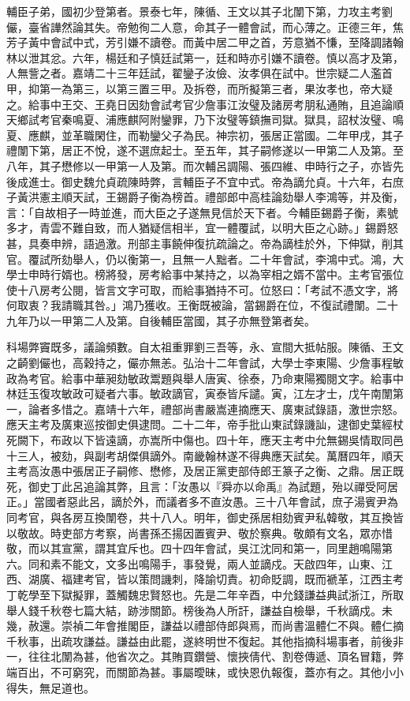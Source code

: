 輔臣子弟，國初少登第者。景泰七年，陳循、王文以其子北闈下第，力攻主考劉儼，臺省譁然論其失。帝勉徇二人意，命其子一體會試，而心薄之。正德三年，焦芳子黃中會試中式，芳引嫌不讀卷。而黃中居二甲之首，芳意猶不慊，至降調諸翰林以泄其忿。六年，楊廷和子慎廷試第一，廷和時亦引嫌不讀卷。慎以高才及第，人無訾之者。嘉靖二十三年廷試，翟鑾子汝儉、汝孝俱在試中。世宗疑二人濫首甲，抑第一為第三，以第三置三甲。及拆卷，而所擬第三者，果汝孝也，帝大疑之。給事中王交、王堯日因劾會試考官少詹事江汝璧及諸房考朋私通賄，且追論順天鄉試考官秦鳴夏、浦應麒阿附鑾罪，乃下汝璧等鎮撫司獄。獄具，詔杖汝璧、鳴夏、應麒，並革職閑住，而勒鑾父子為民。神宗初，張居正當國。二年甲戌，其子禮闈下第，居正不悅，遂不選庶起士。至五年，其子嗣修遂以一甲第二人及第。至八年，其子懋修以一甲第一人及第。而次輔呂調陽、張四維、申時行之子，亦皆先後成進士。御史魏允貞疏陳時弊，言輔臣子不宜中式。帝為謫允貞。十六年，右庶子黃洪憲主順天試，王錫爵子衡為榜首。禮部郎中高桂論劾舉人李鴻等，并及衡，言：「自故相子一時並進，而大臣之子遂無見信於天下者。今輔臣錫爵子衡，素號多才，青雲不難自致，而人猶疑信相半，宜一體覆試，以明大臣之心跡。」錫爵怒甚，具奏申辨，語過激。刑部主事饒伸復抗疏論之。帝為謫桂於外，下伸獄，削其官。覆試所劾舉人，仍以衡第一，且無一人黜者。二十年會試，李鴻中式。鴻，大學士申時行婿也。榜將發，房考給事中某持之，以為宰相之婿不當中。主考官張位使十八房考公閱，皆言文字可取，而給事猶持不可。位怒曰：「考試不憑文字，將何取衷？我請職其咎。」鴻乃獲收。王衡既被論，當錫爵在位，不復試禮闈。二十九年乃以一甲第二人及第。自後輔臣當國，其子亦無登第者矣。

科場弊竇既多，議論頻數。自太祖重罪劉三吾等，永、宣間大抵帖服。陳循、王文之齮劉儼也，高穀持之，儼亦無恙。弘治十二年會試，大學士李東陽、少詹事程敏政為考官。給事中華昶劾敏政鬻題與舉人唐寅、徐泰，乃命東陽獨閱文字。給事中林廷玉復攻敏政可疑者六事。敏政謫官，寅泰皆斥譴。寅，江左才士，戊午南闈第一，論者多惜之。嘉靖十六年，禮部尚書嚴嵩連摘應天、廣東試錄語，激世宗怒。應天主考及廣東巡按御史俱逮問。二十二年，帝手批山東試錄譏訕，逮御史葉經杖死闕下，布政以下皆遠謫，亦嵩所中傷也。四十年，應天主考中允無錫吳情取同邑十三人，被劾，與副考胡傑俱謫外。南畿翰林遂不得典應天試矣。萬曆四年，順天主考高汝愚中張居正子嗣修、懋修，及居正黨吏部侍郎王篆子之衡、之鼎。居正既死，御史丁此呂追論其弊，且言：「汝愚以『舜亦以命禹』為試題，殆以禪受阿居正。」當國者惡此呂，謫於外，而議者多不直汝愚。三十八年會試，庶子湯賓尹為同考官，與各房互換闈卷，共十八人。明年，御史孫居相劾賓尹私韓敬，其互換皆以敬故。時吏部方考察，尚書孫丕揚因置賓尹、敬於察典。敬頗有文名，眾亦惜敬，而以其宣黨，謂其宜斥也。四十四年會試，吳江沈同和第一，同里趙鳴陽第六。同和素不能文，文多出鳴陽手，事發覺，兩人並謫戍。天啟四年，山東、江西、湖廣、福建考官，皆以策問譏刺，降諭切責。初命貶調，既而褫革，江西主考丁乾學至下獄擬罪，蓋觸魏忠賢怒也。先是二年辛酉，中允錢謙益典試浙江，所取舉人錢千秋卷七篇大結，跡涉關節。榜後為人所訐，謙益自檢舉，千秋謫戍。未幾，赦還。崇禎二年會推閣臣，謙益以禮部侍郎與焉，而尚書溫體仁不與。體仁摘千秋事，出疏攻謙益。謙益由此罷，遂終明世不復起。其他指摘科場事者，前後非一，往往北闈為甚，他省次之。其賄買鑽營、懷挾倩代、割卷傳遞、頂名冒籍，弊端百出，不可窮究，而關節為甚。事屬曖昧，或快恩仇報復，蓋亦有之。其他小小得失，無足道也。

